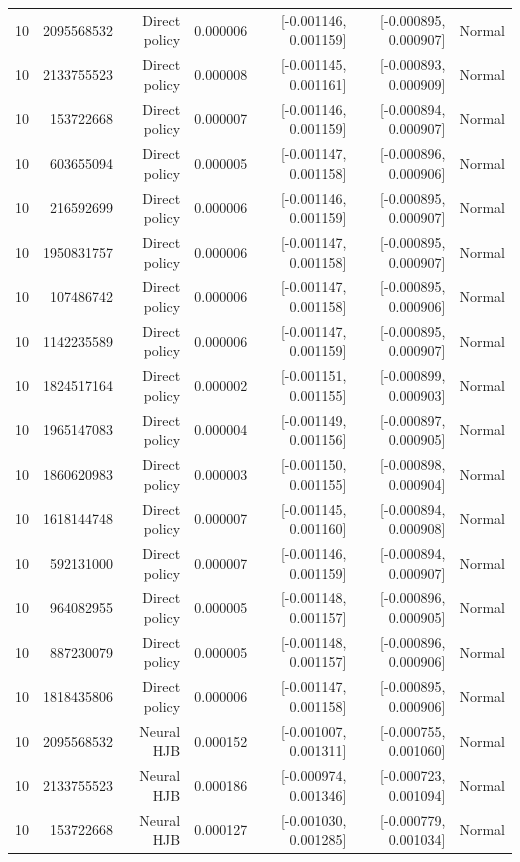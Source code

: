 \begin{longtable}{lrrrrrr}
10 & 2095568532 & Direct policy & 0.000006 & [-0.001146, 0.001159] & [-0.000895, 0.000907] & Normal \\
10 & 2133755523 & Direct policy & 0.000008 & [-0.001145, 0.001161] & [-0.000893, 0.000909] & Normal \\
10 & 153722668 & Direct policy & 0.000007 & [-0.001146, 0.001159] & [-0.000894, 0.000907] & Normal \\
10 & 603655094 & Direct policy & 0.000005 & [-0.001147, 0.001158] & [-0.000896, 0.000906] & Normal \\
10 & 216592699 & Direct policy & 0.000006 & [-0.001146, 0.001159] & [-0.000895, 0.000907] & Normal \\
10 & 1950831757 & Direct policy & 0.000006 & [-0.001147, 0.001158] & [-0.000895, 0.000907] & Normal \\
10 & 107486742 & Direct policy & 0.000006 & [-0.001147, 0.001158] & [-0.000895, 0.000906] & Normal \\
10 & 1142235589 & Direct policy & 0.000006 & [-0.001147, 0.001159] & [-0.000895, 0.000907] & Normal \\
10 & 1824517164 & Direct policy & 0.000002 & [-0.001151, 0.001155] & [-0.000899, 0.000903] & Normal \\
10 & 1965147083 & Direct policy & 0.000004 & [-0.001149, 0.001156] & [-0.000897, 0.000905] & Normal \\
10 & 1860620983 & Direct policy & 0.000003 & [-0.001150, 0.001155] & [-0.000898, 0.000904] & Normal \\
10 & 1618144748 & Direct policy & 0.000007 & [-0.001145, 0.001160] & [-0.000894, 0.000908] & Normal \\
10 & 592131000 & Direct policy & 0.000007 & [-0.001146, 0.001159] & [-0.000894, 0.000907] & Normal \\
10 & 964082955 & Direct policy & 0.000005 & [-0.001148, 0.001157] & [-0.000896, 0.000905] & Normal \\
10 & 887230079 & Direct policy & 0.000005 & [-0.001148, 0.001157] & [-0.000896, 0.000906] & Normal \\
10 & 1818435806 & Direct policy & 0.000006 & [-0.001147, 0.001158] & [-0.000895, 0.000906] & Normal \\
10 & 2095568532 & Neural HJB & 0.000152 & [-0.001007, 0.001311] & [-0.000755, 0.001060] & Normal \\
10 & 2133755523 & Neural HJB & 0.000186 & [-0.000974, 0.001346] & [-0.000723, 0.001094] & Normal \\
10 & 153722668 & Neural HJB & 0.000127 & [-0.001030, 0.001285] & [-0.000779, 0.001034] & Normal \\

\end{longtable}
